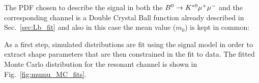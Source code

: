 The PDF chosen to describe the signal in both the ${{B}^0} \rightarrow{\ensuremath{{K}^{*0}}}{\ensuremath{\mu^+\mu^-}}$ and the corresponding
\jpsi channel is a Double Crystal Ball function already described in Sec.~\ref{sec:Lb_fit} and also
in this case the mean value ($m_0$) is kept in common:







As a first step, simulated distributions are fit using the signal model in order to extract shape parameters
that are then constrained in the fit to data.
The fitted Monte Carlo distribution for the resonant channel is shown in Fig.~\ref{fig:mumu_MC_fits}.

